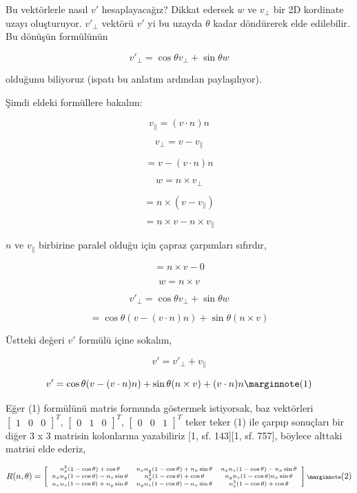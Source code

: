 \documentclass[12pt,fleqn]{article}\usepackage{../../common}
\begin{document}
Bu vektörlerle nasıl $v'$ hesaplayacağız? Dikkat edersek $w$ ve $v_\perp$ bir 2D
kordinate uzayı oluşturuyor. $v'_\perp$ vektörü $v'$ yi bu uzayda $\theta$ kadar
döndürerek elde edilebilir. Bu dönüşün formülünün

$$
v'_\perp = \cos \theta v_\perp + \sin \theta w
$$

olduğunu biliyoruz (ispatı bu anlatım ardından paylaşılıyor).

Şimdi eldeki formüllere bakalım:

$$
v_\parallel = (v \cdot n) n
$$

$$
v_\perp = v - v_\parallel
$$

$$
= v - (v \cdot n) n
$$

$$
w = n \times v_\perp
$$

$$
= n \times (v - v_\parallel)
$$

$$
= n \times v - n \times v_\parallel
$$

$n$ ve $v_\parallel$ birbirine paralel olduğu için çapraz çarpımları sıfırdır,

$$
= n \times v - 0 
$$

$$
w = n \times v
$$

$$
v'_\perp = \cos \theta v_\perp + \sin \theta w
$$

$$
= \cos \theta (v - (v \cdot n) n) + \sin \theta (n \times v)
$$

Üstteki değeri $v'$ formülü içine sokalım,

$$
v' = v'_\perp + v_\parallel
$$

$$
v' = \cos \theta (v - (v \cdot n) n) + \sin \theta (n \times v) + (v \cdot n) n
\mlabel{1}
$$

Eğer (1) formülünü matris formunda göstermek istiyorsak, baz vektörleri
$[\begin{array}{ccc} 1 & 0 & 0 \end{array}]^T$,
$[\begin{array}{ccc} 0 & 1 & 0 \end{array}]^T$,
$[\begin{array}{ccc} 0 & 0 & 1 \end{array}]^T$ teker teker (1) ile çarpıp
sonuçları bir diğer 3 x 3 matrisin kolonlarına yazabiliriz [1, sf. 143][1, sf. 757], 
böylece alttaki matrisi elde ederiz,

$$
\scriptsize
R(n,\theta) =
\left[\begin{array}{ccc}
n_x^2(1-\cos\theta)+\cos\theta & n_x n_y (1-\cos\theta)+n_x \sin\theta & n_x n_z (1-\cos\theta)-n_x\sin\theta\\
n_x n_y (1-\cos\theta)-n_z\sin\theta & n_y^2(1-\cos\theta)+\cos\theta & n_y n_z (1-\cos\theta)n_x\sin\theta\\
n_x n_z (1-\cos\theta)+n_y \sin\theta & n_y n_z (1-\cos\theta)-n_x \sin\theta & n_z^2 (1-\cos\theta)+\cos\theta
\end{array}\right]
\mlabel{2}
$$
\end{document}
